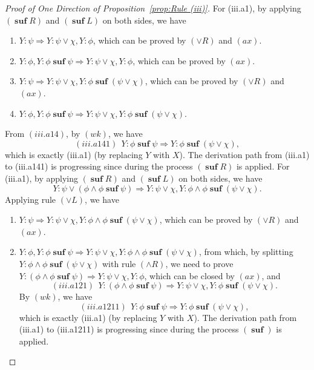 \documentclass[manuscript,screen]{acmart}
\DeclareMathOperator{\osuf}{\mathbf{suf}}
\begin{document}
\begin{proof}[Proof of One Direction of Proposition~\ref{prop:Rule (iii)}]
For (iii.a1), by applying $(\osuf R)$ and $(\osuf L)$ on both sides, we have
\begin{enumerate}
\item[$(iii.a11)$] $Y : \psi \Rightarrow Y : \psi\vee \chi, Y : \phi$, which can be proved by $(\vee R)$ and $(ax)$. 
\item[$(iii.a12)$] $Y : \phi, Y : \phi\osuf \psi\Rightarrow Y : \psi\vee \chi, Y : \phi$, which can be proved by $(ax)$. 
\item[$(iii.a13)$] $Y : \psi \Rightarrow Y : \psi\vee \chi, Y : \phi\osuf (\psi\vee \chi)$, which can be proved by $(\vee R)$ and $(ax)$. 
\item[$(iii.a14)$] $Y : \phi, Y : \phi\osuf\psi \Rightarrow Y : \psi\vee \chi, Y : \phi\osuf (\psi\vee \chi)$. 
\end{enumerate}
From $(iii.a14)$, by $(wk)$, we have 
$$
(iii.a141)\ \ Y : \phi\osuf \psi\Rightarrow Y : \phi\osuf (\psi\vee \chi), 
$$
which is exactly (iii.a1) (by replacing $Y$ with $X$). 
The derivation path from (iii.a1) to (iii.a141) is progressing since during the process $(\osuf R)$ is applied. 
\ifx
For (iii.a1), by applying $(\osuf R)$ and $(\osuf L)$ on both sides, we have 
$$
Y : \psi \vee (\phi\wedge \phi\osuf \psi)\Rightarrow Y : \psi\vee \chi, Y : \phi\wedge \phi\osuf (\psi\vee \chi).
$$
Applying rule $(\vee L)$, we have
\begin{enumerate}
\item[$(iii.a11)$] $Y : \psi \Rightarrow Y : \psi\vee \chi, Y : \phi\wedge \phi\osuf (\psi\vee \chi)$, which can be proved by $(\vee R)$ and $(ax)$. 
\item[$(iii.a12)$] $Y : \phi, Y : \phi\osuf \psi\Rightarrow Y : \psi\vee \chi, Y : \phi\wedge \phi\osuf (\psi\vee \chi)$, from which, by splitting $Y : \phi\wedge \phi\osuf (\psi\vee \chi)$ with rule $(\wedge R)$, we need to prove $Y : (\phi\wedge \phi\osuf \psi)\Rightarrow Y : \psi\vee \chi, Y : \phi$, which can be closed by $(ax)$, and 
$$
(iii.a121)\ \ Y : (\phi\wedge \phi\osuf \psi)\Rightarrow Y : \psi\vee \chi, Y : \phi\osuf (\psi\vee \chi). 
$$
By $(wk)$, we have
$$
(iii.a1211)\ \ Y : \phi\osuf \psi\Rightarrow Y : \phi\osuf (\psi\vee \chi), 
$$
which is exactly (iii.a1) (by replacing $Y$ with $X$). 
The derivation path from (iii.a1) to (iii.a1211) is progressing since during the process $(\osuf)$ is applied. 
\end{enumerate}
\fi


\end{proof}
\end{document}
